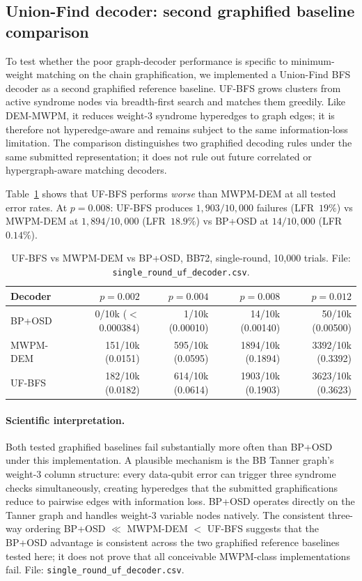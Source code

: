 \documentclass[11pt,a4paper]{article}
\begin{document}
\subsection{Union-Find decoder: second graphified baseline comparison}
\label{ssec:uf}

To test whether the poor graph-decoder performance is specific to minimum-weight
matching on the chain graphification, we implemented a Union-Find BFS decoder
as a second graphified reference baseline.
UF-BFS grows clusters from active syndrome nodes via breadth-first search and
matches them greedily.
Like DEM-MWPM, it reduces weight-3 syndrome hyperedges to graph edges; it is
therefore not hyperedge-aware and remains subject to the same information-loss
limitation.
The comparison distinguishes two graphified decoding rules under the same
submitted representation; it does not rule out future correlated or hypergraph-aware
matching decoders.

Table~\ref{tab:uf} shows that UF-BFS performs \emph{worse} than MWPM-DEM
at all tested error rates.
At $p=0.008$: UF-BFS produces $1{,}903/10{,}000$ failures (LFR~$19\%$)
vs MWPM-DEM at $1{,}894/10{,}000$ (LFR~$18.9\%$) vs BP+OSD at $14/10{,}000$
(LFR~$0.14\%$).

\begin{table}[H]\centering\small
\caption{UF-BFS vs MWPM-DEM vs BP+OSD, BB72, single-round, 10{,}000 trials.
  File: \texttt{single\_round\_uf\_decoder.csv}.}
\label{tab:uf}
\begin{tabular}{@{}lrrrr@{}}
\toprule
Decoder & $p=0.002$ & $p=0.004$ & $p=0.008$ & $p=0.012$ \\
\midrule
BP+OSD   & 0/10k ($<$0.000384) & 1/10k (0.00010) & 14/10k (0.00140) & 50/10k (0.00500) \\
MWPM-DEM & 151/10k (0.0151) & 595/10k (0.0595) & 1894/10k (0.1894) & 3392/10k (0.3392) \\
UF-BFS   & 182/10k (0.0182) & 614/10k (0.0614) & 1903/10k (0.1903) & 3623/10k (0.3623) \\
\bottomrule
\end{tabular}
\end{table}

\paragraph{Scientific interpretation.}
Both tested graphified baselines fail substantially more often than BP+OSD under this implementation.
A plausible mechanism is the BB Tanner graph's weight-3 column structure: every data-qubit error can trigger three syndrome checks simultaneously, creating hyperedges that the submitted graphifications reduce to pairwise edges with information loss.
BP+OSD operates directly on the Tanner graph and handles weight-3
variable nodes natively.
The consistent three-way ordering BP+OSD $\ll$ MWPM-DEM $<$ UF-BFS
suggests that the BP+OSD advantage is consistent across the two graphified
reference baselines tested here; it does not prove that all conceivable
MWPM-class implementations fail.
File: \texttt{single\_round\_uf\_decoder.csv}.
\end{document}
